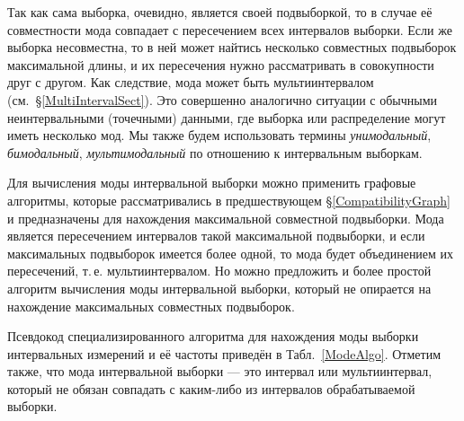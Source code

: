 \documentclass[a5paper,openany]{book}
\begin{document}
    
Так как сама выборка, очевидно, является своей подвыборкой, то в случае её совместности 
мода совпадает с пересечением всех интервалов выборки. Если же выборка несовместна, 
то в ней может найтись несколько совместных подвыборок максимальной длины, и их 
пересечения нужно рассматривать в совокупности друг с другом. Как следствие, мода 
может быть мультиинтервалом (см.~\S\ref{MultiIntervalSect}). Это совершенно аналогично 
ситуации с обычными неинтервальными (точечными) данными, где выборка или распределение 
могут иметь несколько мод. Мы также будем использовать термины \emph{унимодальный}, 
\emph{бимодальный}, \emph{мультимодальный} по отношению к интервальным выборкам. 
  
Для вычисления моды интервальной выборки можно применить графовые алгоритмы, 
которые рассматривались в предшествующем \S\ref{CompatibilityGraph} и предназначены 
для нахождения максимальной совместной подвыборки. Мода является пересечением 
интервалов такой максимальной подвыборки, и если максимальных подвыборок имеется 
более одной, то мода будет объединением их пересечений, т.\,е. мультиинтервалом. 
Но можно предложить и более простой алгоритм вычисления моды интервальной выборки, 
который не опирается на нахождение максимальных совместных подвыборок. 
  
Псевдокод специализированного алгоритма для нахождения моды выборки интервальных 
измерений и её частоты приведён в Табл.~\ref{ModeAlgo}. Отметим также, что мода 
интервальной выборки --- это интервал или мультиинтервал, который не обязан совпадать 
с каким-либо из интервалов обрабатываемой выборки. 
  
\end{document}
